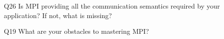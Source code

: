 \begin{description}%
\item{Q26} Is MPI providing all the communication semantics required by your application? If not, what is missing?%
\item{Q19} What are your obstacles to mastering MPI?%
\end{description}%
